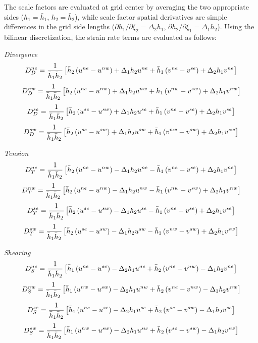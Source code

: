 The scale factors are evaluated at grid center by averaging the two
appropriate sides ($h_1=\bar{h}_1$, $h_2=\bar{h}_2$), while scale factor
spatial derivatives are simple differences in the grid side lengths 
($\partial h_1/\partial\xi_2=\Delta_2 h_1$, $\partial h_2/\partial\xi_1=\Delta_1
h_2$). Using the bilinear discretization, the strain rate terms are
evaluated as follows:

{\it Divergence}
$$
D_D^{ne}={1\over \bar{h}_1\bar{h}_2}
\left[\bar{h}_2\left(u^{ne}-u^{nw}\right) + \Delta_1h_2u^{ne} 
+\bar{h}_1\left(v^{ne}-v^{se}\right) + \Delta_2h_1v^{ne}\right] $$  
$$
D_D^{nw}={1\over \bar{h}_1\bar{h}_2}
\left[\bar{h}_2\left(u^{ne}-u^{nw}\right) + \Delta_1h_2u^{nw} 
+\bar{h}_1\left(v^{nw}-v^{sw}\right) + \Delta_2h_1v^{nw}\right] $$  
$$
D_D^{se}={1\over \bar{h}_1\bar{h}_2}
\left[\bar{h}_2\left(u^{se}-u^{sw}\right) + \Delta_1h_2u^{se} 
+\bar{h}_1\left(v^{ne}-v^{se}\right) + \Delta_2h_1v^{se}\right] $$  
$$
D_D^{sw}={1\over \bar{h}_1\bar{h}_2}
\left[\bar{h}_2\left(u^{se}-u^{sw}\right) + \Delta_1h_2u^{sw} 
+\bar{h}_1\left(v^{nw}-v^{sw}\right) + \Delta_2h_1v^{sw}\right] $$  

{\it Tension}
$$
D_T^{ne}= {1\over \bar{h}_1\bar{h}_2}
\left[\bar{h}_2\left(u^{ne}-u^{nw}\right) - \Delta_1h_2u^{ne} 
-\bar{h}_1\left(v^{ne}-v^{se}\right) + \Delta_2h_1v^{ne}\right] $$  
$$
D_T^{nw}= {1\over \bar{h}_1\bar{h}_2}
\left[\bar{h}_2\left(u^{ne}-u^{nw}\right) - \Delta_1h_2u^{nw} 
-\bar{h}_1\left(v^{nw}-v^{sw}\right) + \Delta_2h_1v^{nw}\right] $$  
$$
D_T^{se}= {1\over \bar{h}_1\bar{h}_2}
\left[\bar{h}_2\left(u^{se}-u^{sw}\right) - \Delta_1h_2u^{se} 
-\bar{h}_1\left(v^{ne}-v^{se}\right) + \Delta_2h_1v^{se}\right] $$  
$$
D_T^{sw}= {1\over \bar{h}_1\bar{h}_2}
\left[\bar{h}_2\left(u^{se}-u^{sw}\right) - \Delta_1h_2u^{sw} 
-\bar{h}_1\left(v^{nw}-v^{sw}\right) + \Delta_2h_1v^{sw}\right] $$  

{\it Shearing}
$$
D_S^{ne}= {1\over \bar{h}_1\bar{h}_2}
\left[\bar{h}_1\left(u^{ne}-u^{se}\right) - \Delta_2h_1u^{ne}
+\bar{h}_2\left(v^{ne}-v^{nw}\right) - \Delta_1h_2v^{ne}\right] $$  
$$
D_S^{nw}= {1\over \bar{h}_1\bar{h}_2}
\left[\bar{h}_1\left(u^{nw}-u^{sw}\right) - \Delta_2h_1u^{nw}
+\bar{h}_2\left(v^{ne}-v^{nw}\right) - \Delta_1h_2v^{nw}\right] $$  
$$
D_S^{se}= {1\over \bar{h}_1\bar{h}_2}
\left[\bar{h}_1\left(u^{ne}-u^{se}\right) - \Delta_2h_1u^{se}
+\bar{h}_2\left(v^{se}-v^{sw}\right) - \Delta_1h_2v^{se}\right] $$  
$$
D_S^{sw}= {1\over \bar{h}_1\bar{h}_2}
\left[\bar{h}_1\left(u^{nw}-u^{sw}\right) - \Delta_2h_1u^{sw}
+\bar{h}_2\left(v^{se}-v^{sw}\right) - \Delta_1h_2v^{sw}\right] $$  

